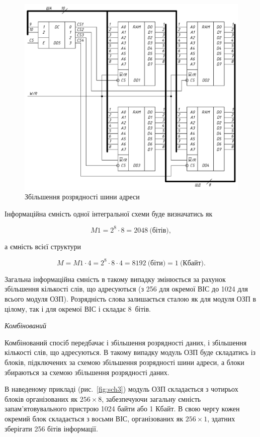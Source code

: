 \begin{figure}[h]
\centering
\includegraphics[width=\textwidth]{img/sch2(2)-crop.pdf}
\caption{Збільшення розрядності шини адреси}
\label{fig:sch2}
\end{figure}

Інформаційна ємність одної інтегральної схеми буде визначатись як

$$M1 = 2^{8}\cdot8 = 2048~\text{(бітів)},$$    

\noindent
а ємність всієї структури 

$$M = M1\cdot4 = 2^{8}\cdot8\cdot4 = 8192~\text{(біти)} = 1~\text{(Кбайт)}.$$

Загальна інформаційна ємність в такому випадку змінюється за рахунок збільшення кількості слів, що адресуються (з 256 для окремої ВІС до 1024 для всього модуля ОЗП). Розрядність слова залишається сталою як для модуля ОЗП в цілому, так і для окремої ВІС і складає 8~бітів. 

\begin{center}
\textit{Комбінований}
\end{center}

Комбінований спосіб передбачає і збільшення розрядності даних, і збільшення кількості слів, що адресуються. В такому випадку модуль ОЗП буде складатись із блоків, підключених за схемою збільшення розрядності шини адреси, а блоки збираються за схемою збільшення роз\-ряд\-нос\-ті даних.  

В наведеному прикладі (рис.~\ref{fig:sch3}) модуль ОЗП складається з чотирьох блоків організованих як $256\times8$, забезпечуючи загальну ємність запам'ятовувального пристрою 1024 байти або 1 Кбайт. В свою чергу кожен окремий блок складається з восьми ВІС, організованих як $256\times1$, здатних зберігати 256 бітів інформації.  

